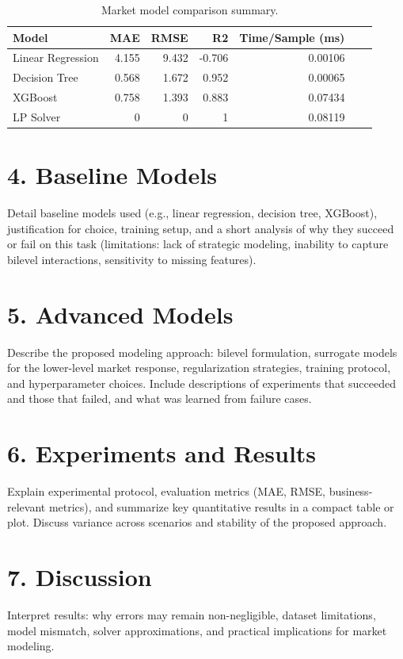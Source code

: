 \documentclass[twocolumn,10pt]{article}
\begin{document}
\begin{table}
\caption{Market model comparison summary.}
\label{tab:market_comparison_summary}
\begin{tabular}{lrrrrrr}
\toprule
Model & MAE & RMSE & R2 & Time/Sample (ms) \\
\midrule
Linear Regression & 4.155 & 9.432 & -0.706 & 0.00106 \\
Decision Tree & 0.568 & 1.672 & 0.952 & 0.00065 \\
XGBoost & 0.758 & 1.393 & 0.883 & 0.07434 \\
LP Solver & 0 & 0 & 1 & 0.08119 \\
\bottomrule
\end{tabular}
\end{table}


\section*{4. Baseline Models}
Detail baseline models used (e.g., linear regression, decision tree, XGBoost), justification for choice, training setup, and a short analysis of why they succeed or fail on this task (limitations: lack of strategic modeling, inability to capture bilevel interactions, sensitivity to missing features).

\section*{5. Advanced Models}
Describe the proposed modeling approach: bilevel formulation, surrogate models for the lower-level market response, regularization strategies, training protocol, and hyperparameter choices. Include descriptions of experiments that succeeded and those that failed, and what was learned from failure cases.

\section*{6. Experiments and Results}
Explain experimental protocol, evaluation metrics (MAE, RMSE, business-relevant metrics), and summarize key quantitative results in a compact table or plot. Discuss variance across scenarios and stability of the proposed approach.

\section*{7. Discussion}
Interpret results: why errors may remain non-negligible, dataset limitations, model mismatch, solver approximations, and practical implications for market modeling.
\end{document}
